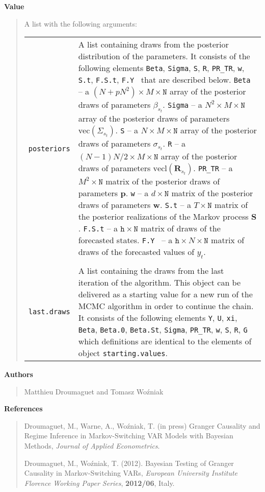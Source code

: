 \documentclass[final,3p,authoryear]{elsarticle}
\begin{document}
\bigskip\noindent\textbf{Value}
\begin{quote}
A list with the following arguments:

\smallskip\begin{tabular}{p{3cm}p{10cm}}
\texttt{posteriors} & A list containing draws from the posterior distribution of the parameters. It consists of the following elements \texttt{Beta}, \texttt{Sigma}, \texttt{S}, \texttt{R}, \texttt{PR\_TR}, \texttt{w}, \texttt{S.t}, \texttt{F.S.t}, \texttt{F.Y } that are described below.
\linebreak
\texttt{Beta} -- a $(N+pN^2)\times M \times \mathtt{N}$ array of the posterior draws of parameters $\beta_{s_t}$.
\texttt{Sigma} -- a $N^2\times M \times \mathtt{N}$ array of the posterior draws of parameters $\text{vec}(\Sigma_{s_t})$.
\texttt{S}  -- a $N\times M \times \mathtt{N}$ array of the posterior draws of parameters $\sigma_{s_t}$.
\texttt{R} -- a $(N-1)N/2\times M \times \mathtt{N}$ array of the posterior draws of parameters $\text{vecl}(\mathbf{R}_{s_t})$.
\texttt{PR\_TR} -- a $M^2 \times \mathtt{N}$ matrix of the posterior draws of parameters $\mathbf{p}$.
\texttt{w} -- a $d \times \mathtt{N}$ matrix of the posterior draws of parameters $\mathbf{w}$.
\texttt{S.t} -- a $T \times \mathtt{N}$ matrix of the posterior realizations of the Markov process $\mathbf{S}$.
\texttt{F.S.t} -- a $\mathtt{h} \times \mathtt{N}$ matrix of draws of the forecasted states.
\texttt{F.Y } -- a $\mathtt{h} \times N \times \mathtt{N}$ matrix of draws of the forecasted values of $y_t$.
\\
&\\
\texttt{last.draws} & A list containing the draws from the last iteration of the algorithm. This object can be delivered as a starting value for a new run of the MCMC algorithm in order to continue the chain. It consists of the following elements 
\texttt{Y}, \texttt{U}, \texttt{xi}, \texttt{Beta}, \texttt{Beta.0}, \texttt{Beta.St}, \texttt{Sigma}, \texttt{PR\_TR}, \texttt{w}, \texttt{S}, \texttt{R}, \texttt{G} which definitions are identical to the elements of object \texttt{starting.values}.
\end{tabular}
\end{quote}


\newpage\noindent\textbf{Authors}
\begin{quote}
Matthieu Droumaguet and Tomasz Wo\'zniak
\end{quote}


\bigskip
\noindent\textbf{References}
\begin{quote}
\noindent Droumaguet, M., Warne, A., Wo\'zniak, T. (in press) Granger Causality and Regime Inference in Markov-Switching VAR Models with Bayesian Methods, \emph{Journal of Applied Econometrics}.

\smallskip\noindent Droumaguet, M., Wo\'zniak, T. (2012). Bayesian Testing of Granger Causality in Markov-Switching VARs, \emph{European University Institute Florence Working Paper Series}, \textbf{2012/06}, Italy.
\end{quote}
\end{document}
